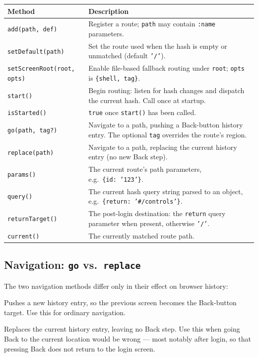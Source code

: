 \begin{longtable}{P{0.26\textwidth}P{0.66\textwidth}}
\toprule
\textbf{Method} & \textbf{Description} \\
\midrule
\endhead
\texttt{add(path, def)} & Register a route; \texttt{path} may contain \texttt{:name} parameters. \\
\texttt{setDefault(\allowbreak path)} & Set the route used when the hash is empty or unmatched (default \texttt{'/'}). \\
\texttt{setScreenRoot(\allowbreak root, opts)} & Enable file-based fallback routing under \texttt{root}; \texttt{opts} is \texttt{\{shell, tag\}}. \\
\texttt{start()} & Begin routing: listen for hash changes and dispatch the current hash.  Call once at startup. \\
\texttt{isStarted()} & \texttt{true} once \texttt{start()} has been called. \\
\texttt{go(path, tag?)} & Navigate to a path, pushing a Back-button history entry.  The optional \texttt{tag} overrides the route's region. \\
\texttt{replace(path)} & Navigate to a path, replacing the current history entry (no new Back step). \\
\texttt{params()} & The current route's path parameters, e.g.\ \texttt{\{id:\ '123'\}}. \\
\texttt{query()} & The current hash query string parsed to an object, e.g.\ \texttt{\{return:\ '\#/controls'\}}. \\
\texttt{returnTarget()} & The post-login destination: the \texttt{return} query parameter when present, otherwise \texttt{'/'}. \\
\texttt{current()} & The currently matched route path. \\
\bottomrule
\end{longtable}

\subsection{Navigation: \texttt{go} vs.\ \texttt{replace}}
\label{sec:rs-router-go}

The two navigation methods differ only in their effect on browser history:

\begin{description}[style=nextline]
  \item[\texttt{Router.go(path, tag?)}] Pushes a new history entry, so the previous screen becomes the Back-button target.  Use this for ordinary navigation.
  \item[\texttt{Router.replace(path)}] Replaces the current history entry, leaving no Back step.  Use this when going Back to the current location would be wrong --- most notably after login, so that pressing Back does not return to the login screen.
\end{description}

